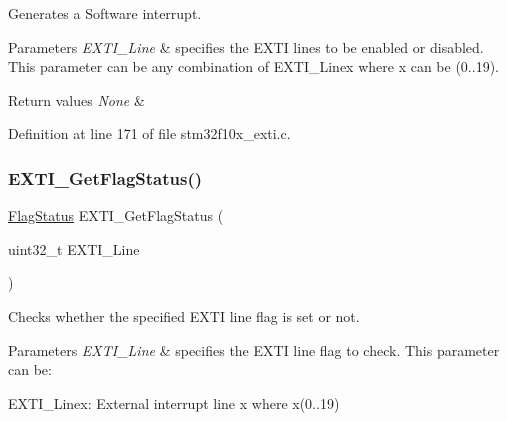 Generates a Software interrupt. 


\begin{DoxyParams}{Parameters}
{\em E\+X\+T\+I\+\_\+\+Line} & specifies the E\+X\+TI lines to be enabled or disabled. This parameter can be any combination of E\+X\+T\+I\+\_\+\+Linex where x can be (0..19). \\
\hline
\end{DoxyParams}

\begin{DoxyRetVals}{Return values}
{\em None} & \\
\hline
\end{DoxyRetVals}


Definition at line 171 of file stm32f10x\+\_\+exti.\+c.

\mbox{\label{group___e_x_t_i___exported___functions_ga0ce06e6b312592df149800d63218cffa}} 
\subsubsection{\texorpdfstring{E\+X\+T\+I\+\_\+\+Get\+Flag\+Status()}{EXTI\_GetFlagStatus()}}
{\footnotesize\ttfamily \hyperlink{group___exported__types_ga89136caac2e14c55151f527ac02daaff}{Flag\+Status} E\+X\+T\+I\+\_\+\+Get\+Flag\+Status (\begin{DoxyParamCaption}\item[{uint32\+\_\+t}]{E\+X\+T\+I\+\_\+\+Line }\end{DoxyParamCaption})}



Checks whether the specified E\+X\+TI line flag is set or not. 


\begin{DoxyParams}{Parameters}
{\em E\+X\+T\+I\+\_\+\+Line} & specifies the E\+X\+TI line flag to check. This parameter can be\+: \begin{DoxyItemize}
\item E\+X\+T\+I\+\_\+\+Linex\+: External interrupt line x where x(0..19) \end{DoxyItemize}
\\
\hline
\end{DoxyParams}

